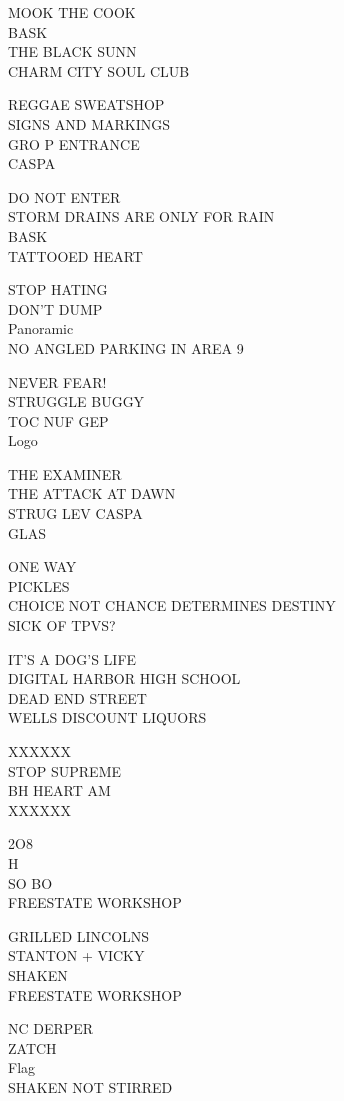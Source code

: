 \documentclass[10pt,letterpaper]{article}
\begin{document}
MOOK THE COOK\\
BASK\\
THE BLACK SUNN\\
CHARM CITY SOUL CLUB

REGGAE SWEATSHOP\\
SIGNS AND MARKINGS\\
GRO P ENTRANCE\\
CASPA

DO NOT ENTER\\
STORM DRAINS ARE ONLY FOR RAIN\\
BASK\\
TATTOOED HEART

STOP HATING\\
DON'T DUMP\\
Panoramic\\
NO ANGLED PARKING IN AREA 9

NEVER FEAR!\\
STRUGGLE BUGGY\\
TOC NUF GEP\\
Logo

THE EXAMINER\\
THE ATTACK AT DAWN\\
STRUG LEV CASPA\\
GLAS

ONE WAY\\
PICKLES\\
CHOICE NOT CHANCE DETERMINES DESTINY\\
SICK OF TPVS?

IT'S A DOG'S LIFE\\
DIGITAL HARBOR HIGH SCHOOL\\
DEAD END STREET\\
WELLS DISCOUNT LIQUORS

XXXXXX\\
STOP SUPREME\\
BH HEART AM\\
XXXXXX

2O8\\
H\\
SO BO\\
FREESTATE WORKSHOP

GRILLED LINCOLNS\\
STANTON + VICKY\\
SHAKEN\\
FREESTATE WORKSHOP

NC DERPER\\
ZATCH\\
Flag\\
SHAKEN NOT STIRRED
\end{document}
